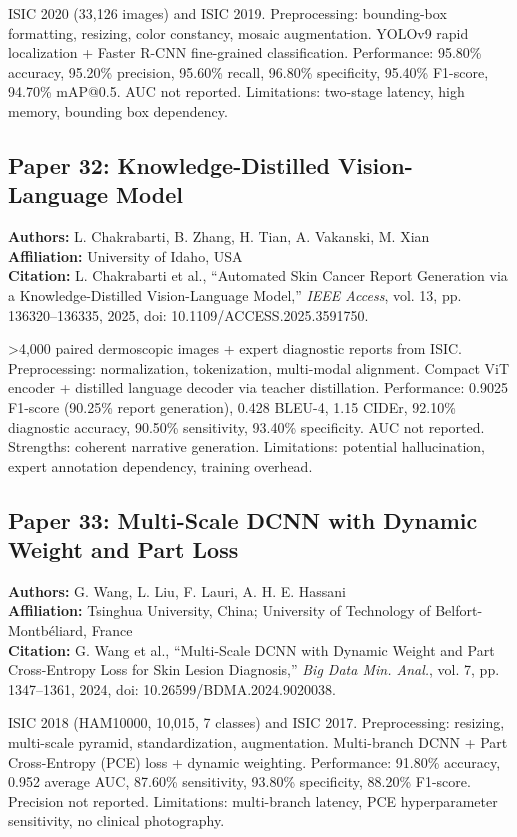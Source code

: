 \documentclass[conference]{IEEEtran}
\begin{document}
ISIC 2020 (33,126 images) and ISIC 2019. Preprocessing: bounding-box formatting, resizing, color constancy, mosaic augmentation. YOLOv9 rapid localization + Faster R-CNN fine-grained classification. Performance: 95.80\% accuracy, 95.20\% precision, 95.60\% recall, 96.80\% specificity, 95.40\% F1-score, 94.70\% mAP@0.5. AUC not reported. Limitations: two-stage latency, high memory, bounding box dependency.

\subsection{Paper 32: Knowledge-Distilled Vision-Language Model}

\noindent\textbf{Authors:} L. Chakrabarti, B. Zhang, H. Tian, A. Vakanski, M. Xian\\
\textbf{Affiliation:} University of Idaho, USA\\
\textbf{Citation:} L. Chakrabarti et al., ``Automated Skin Cancer Report Generation via a Knowledge-Distilled Vision-Language Model,'' \textit{IEEE Access}, vol. 13, pp. 136320--136335, 2025, doi: 10.1109/ACCESS.2025.3591750.

>4,000 paired dermoscopic images + expert diagnostic reports from ISIC. Preprocessing: normalization, tokenization, multi-modal alignment. Compact ViT encoder + distilled language decoder via teacher distillation. Performance: 0.9025 F1-score (90.25\% report generation), 0.428 BLEU-4, 1.15 CIDEr, 92.10\% diagnostic accuracy, 90.50\% sensitivity, 93.40\% specificity. AUC not reported. Strengths: coherent narrative generation. Limitations: potential hallucination, expert annotation dependency, training overhead.

\subsection{Paper 33: Multi-Scale DCNN with Dynamic Weight and Part Loss}

\noindent\textbf{Authors:} G. Wang, L. Liu, F. Lauri, A. H. E. Hassani\\
\textbf{Affiliation:} Tsinghua University, China; University of Technology of Belfort-Montbéliard, France\\
\textbf{Citation:} G. Wang et al., ``Multi-Scale DCNN with Dynamic Weight and Part Cross-Entropy Loss for Skin Lesion Diagnosis,'' \textit{Big Data Min. Anal.}, vol. 7, pp. 1347--1361, 2024, doi: 10.26599/BDMA.2024.9020038.

ISIC 2018 (HAM10000, 10,015, 7 classes) and ISIC 2017. Preprocessing: resizing, multi-scale pyramid, standardization, augmentation. Multi-branch DCNN + Part Cross-Entropy (PCE) loss + dynamic weighting. Performance: 91.80\% accuracy, 0.952 average AUC, 87.60\% sensitivity, 93.80\% specificity, 88.20\% F1-score. Precision not reported. Limitations: multi-branch latency, PCE hyperparameter sensitivity, no clinical photography.
\end{document}
